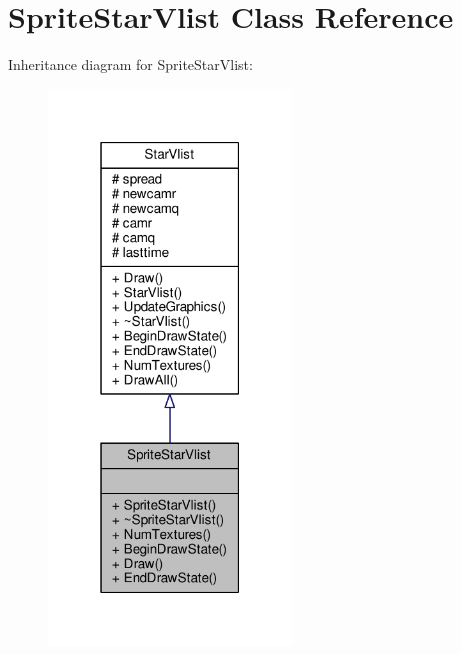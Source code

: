 \hypertarget{classSpriteStarVlist}{}\section{Sprite\+Star\+Vlist Class Reference}
\label{classSpriteStarVlist}


Inheritance diagram for Sprite\+Star\+Vlist\+:
\nopagebreak
\begin{figure}[H]
\begin{center}
\leavevmode
\includegraphics[width=183pt]{db/da7/classSpriteStarVlist__inherit__graph}
\end{center}
\end{figure}



